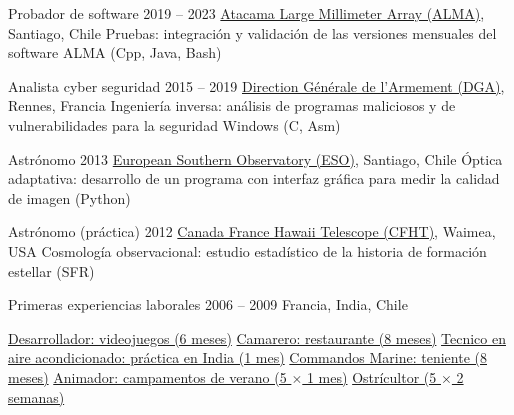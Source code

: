 \begin{joblist}[\tbfwidth][8.4][\tbfyeary]

\setlength{\parskip}{0.3cm}
\vspace{-0.4cm}

\item[Probador de software]{2019 -- 2023}
  {
  \href{https://www.almaobservatory.org}{Atacama Large Millimeter Array (ALMA)}, Santiago, Chile
  }
  {Pruebas: integración y validación de las versiones mensuales del software ALMA (Cpp, Java, Bash)}

\item[Analista cyber seguridad]{2015 -- 2019}
  {
  \href{http://www.defense.gouv.fr/dga/}{Direction Générale de l'Armement (DGA)}, Rennes, Francia
  }
  {Ingeniería inversa: análisis de programas maliciosos y de vulnerabilidades para la seguridad Windows (C, Asm)}




\item[Astrónomo]{2013}
    {
    \href{http://www.eso.org/public/}{European Southern Observatory (ESO)}, Santiago, Chile
    }
    {Óptica adaptativa: desarrollo de un programa con interfaz gráfica para medir la calidad de imagen (Python)}

\item[Astrónomo (práctica)]{2012}
  {
\href{https://www.cfht.hawaii.edu/}{Canada France Hawaii Telescope (CFHT)}, Waimea, USA
  }
  {Cosmología observacional: estudio estadístico de la historia de formación estellar (SFR)}

\item[Primeras experiencias laborales]{2006 -- 2009}
  {
  Francia, India, Chile
  }
  {
    \renewcommand\labelitemi{{}}
    \vspace{-0.8cm}
    \setlength{\parskip}{0cm}
    \begin{itemize}[leftmargin=*, label=\textbullet]
    \setlength\itemsep{0cm}

    \cvitem \href{https://tinmarino.github.io}{Desarrollador: videojuegos (6 meses)}
    \cvitem \href{http://www.insertcoin.cl/}{Camarero: restaurante (8 meses)}
    \cvitem \href{http://www.dupont.co.in/}{Tecnico en aire acondicionado: práctica en India (1 mes)}
    \cvitem \href{http://www.defense.gouv.fr/marine/organisation/forces/fusiliers-marins-et-commandos/force-maritime-des-fusiliers-marins-et-commandos}{Commandos Marine: teniente (8 meses)}
    \cvitem \href{http://www.vacances-pour-tous.org/}{Animador: campamentos de verano (5 $\times$ 1 mes)}
    \cvitem \href{http://huitresdesaintvaast.fr/}{Ostrícultor (5 $\times$ 2 semanas)}
    \end{itemize}
  }
\end{joblist}


\ifx\HCode\undefined
\else
  \maketitle
\fi




